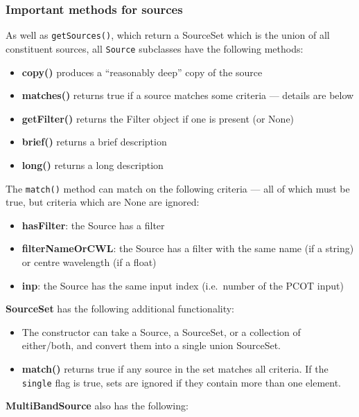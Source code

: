 \subsubsection{Important methods for sources}
As well as \texttt{getSources()}, which return a SourceSet which is the union
of all constituent sources, all \texttt{Source} subclasses have the following
methods:
\begin{itemize}
\item \textbf{copy()} produces a ``reasonably deep'' copy of the source
\item \textbf{matches()} returns true if a source matches some criteria --- details are below
\item \textbf{getFilter()} returns the Filter object if one is present (or None)
\item \textbf{brief()} returns a brief description
\item \textbf{long()} returns a long description
\end{itemize}
The \texttt{match()} method can match on the following criteria --- all of which
must be true, but criteria which are None are ignored:
\begin{itemize}
\item \textbf{hasFilter}: the Source has a filter
\item \textbf{filterNameOrCWL}: the Source has a filter with the same name (if a string)
or centre wavelength (if a float)
\item \textbf{inp}: the Source has the same input index (i.e.\ number of the PCOT input)
\end{itemize}
\textbf{SourceSet} has the following additional functionality:
\begin{itemize}
\item The constructor can take a Source, a SourceSet, or a collection of either/both,
and convert them into a single union SourceSet.
\item \textbf{match()} returns true if any source in the set matches all criteria.
If the \texttt{single} flag is true, sets are ignored if they contain more than one element.
\end{itemize}
\textbf{MultiBandSource} also has the following:
